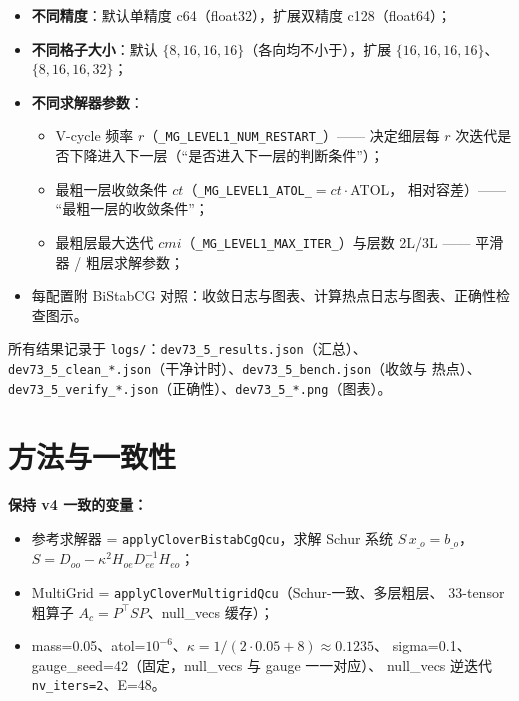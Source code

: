 \documentclass[11pt,a4paper]{article}
\begin{document}
\begin{itemize}
  \item \textbf{不同精度}：默认单精度 c64（float32），扩展双精度 c128（float64）；
  \item \textbf{不同格子大小}：默认 $\{8,16,16,16\}$（各向均不小于），扩展
        $\{16,16,16,16\}$、$\{8,16,16,32\}$；
  \item \textbf{不同求解器参数}：
    \begin{itemize}
      \item V-cycle 频率 $r$（\texttt{\_MG\_LEVEL1\_NUM\_RESTART\_}）——
            决定细层每 $r$ 次迭代是否下降进入下一层（``是否进入下一层的判断条件''）；
      \item 最粗一层收敛条件 $ct$（\texttt{\_MG\_LEVEL1\_ATOL\_}$=ct\cdot$ATOL，
            相对容差）—— ``最粗一层的收敛条件''；
      \item 最粗层最大迭代 $cmi$（\texttt{\_MG\_LEVEL1\_MAX\_ITER\_}）与层数 2L/3L
            —— 平滑器 / 粗层求解参数；
    \end{itemize}
  \item 每配置附 BiStabCG 对照：收敛日志与图表、计算热点日志与图表、正确性检查图示。
\end{itemize}

所有结果记录于 \texttt{logs/}：\texttt{dev73\_5\_results.json}（汇总）、
\texttt{dev73\_5\_clean\_*.json}（干净计时）、\texttt{dev73\_5\_bench.json}（收敛与
热点）、\texttt{dev73\_5\_verify\_*.json}（正确性）、\texttt{dev73\_5\_*.png}（图表）。

\section{方法与一致性}
\label{sec:method}

\textbf{保持 v4 一致的变量：}
\begin{itemize}
  \item 参考求解器 = \texttt{applyCloverBistabCgQcu}，求解 Schur 系统
        $S\,x_{\_o}=b_{\_o}$，$S=D_{oo}-\kappa^2 H_{oe}D_{ee}^{-1}H_{eo}$；
  \item MultiGrid = \texttt{applyCloverMultigridQcu}（Schur-一致、多层粗层、
        33-tensor 粗算子 $A_c=P^\top S P$、null\_vecs 缓存）；
  \item mass=0.05、atol=$10^{-6}$、$\kappa=1/(2\cdot0.05+8)\approx0.1235$、
        sigma=0.1、gauge\_seed=42（固定，null\_vecs 与 gauge 一一对应）、
        null\_vecs 逆迭代 \texttt{nv\_iters=2}、E=48。
\end{itemize}
\end{document}
